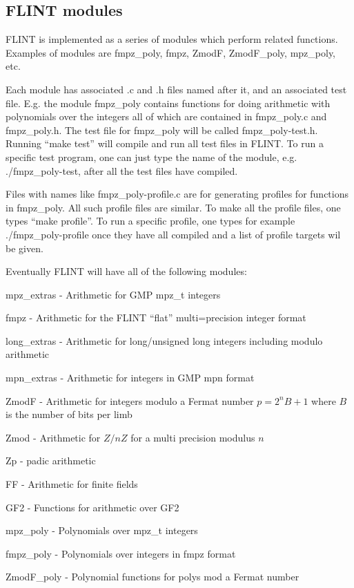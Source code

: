 \documentclass[a4paper,10pt]{article}
\begin{document}
\subsection{FLINT modules}
FLINT is implemented as a series of modules which perform related functions. Examples of modules are fmpz\_poly, fmpz, ZmodF, ZmodF_poly, mpz\_poly, etc.

Each module has associated .c and .h files named after it, and an associated test file. E.g. the module fmpz\_poly contains functions for doing arithmetic with polynomials over the integers all of which are contained in fmpz\_poly.c and fmpz\_poly.h. The test file for fmpz\_poly will be called fmpz\_poly-test.h. Running ``make test'' will compile and run all test files in FLINT. To run a specific test program, one can just type the name of the module, e.g. ./fmpz\_poly-test, after all the test files have compiled. 

Files with names like fmpz\_poly-profile.c are for generating profiles for functions in fmpz\_poly. All such profile files are similar. To make all the profile files, one types ``make profile''. To run a specific profile, one types for example ./fmpz\_poly-profile once they have all compiled and a list of profile targets wil be given.

Eventually FLINT will have all of the following modules:

mpz\_extras - Arithmetic for GMP mpz\_t integers

fmpz - Arithmetic for the FLINT ``flat'' multi=precision integer format

long\_extras - Arithmetic for long/unsigned long integers including modulo arithmetic

mpn\_extras - Arithmetic for integers in GMP mpn format

ZmodF - Arithmetic for integers modulo a Fermat number $p = 2^nB+1$ where $B$ is the number of bits per limb

Zmod - Arithmetic for $Z/nZ$ for a multi precision modulus $n$

Zp - padic arithmetic

FF - Arithmetic for finite fields 

GF2 - Functions for arithmetic over GF2

\vspace{5mm}

mpz\_poly - Polynomials over mpz\_t integers

fmpz\_poly - Polynomials over integers in fmpz format

ZmodF\_poly - Polynomial functions for polys mod a Fermat number
\end{document}
